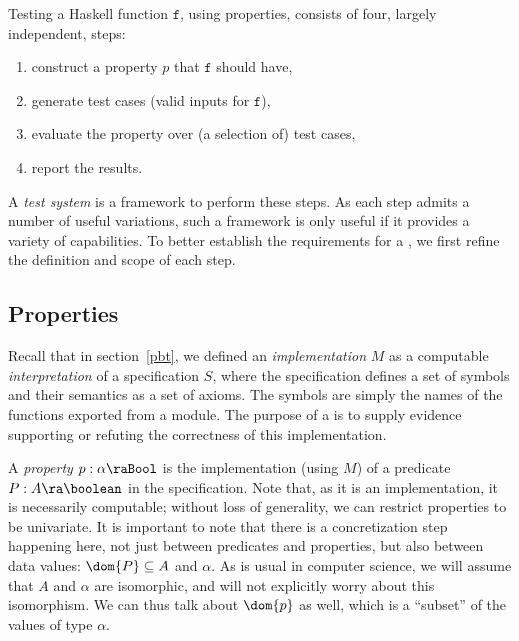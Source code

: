 
\newcommand{\hf}{\ensuremath{\mathtt{f}}\xspace}
\newcommand{\Bool}{\ensuremath{\mathtt{Bool}}}

Testing a Haskell function \hf, using properties, consists of four, largely
independent, steps:
\begin{enumerate}
\item construct a property $p$ that \hf should have,
\item generate test cases (valid inputs for \hf),
\item evaluate the property over (a selection of) test cases,
\item report the results.
\end{enumerate}

A \emph{test system} is a framework to perform these steps.  As each
step admits a number of useful variations, such a framework is only 
useful if it provides a variety of capabilities.  To better establish the
requirements for a \pbt, we first refine the definition and scope of each
step.

\subsection{Properties}

Recall that in section~\ref{pbt}, we defined an \emph{implementation} $M$ as a
computable \emph{interpretation} of a specification $S$, where the specification
defines a set of symbols and their semantics as a set of axioms.
The symbols are simply the names of the functions exported from a module.
The purpose of a \pbt is to supply evidence supporting or refuting
the correctness of this implementation.

A \emph{property}  $ p: \alpha \ra \Bool$ is the implementation (using $M$) of
a predicate $P : A \ra \boolean$ in the specification.  Note
that, as it is an implementation, it is necessarily computable; without
loss of generality, we can restrict properties to be univariate.
It is important to note that there is a concretization step happening here,
not just between predicates and properties, but also between data values:
$\dom{P} \subseteq A$ and $\alpha$.  As is usual in computer science, 
we will assume that $A$ and $\alpha$ are isomorphic, and will not explicitly
worry about this isomorphism.  We can thus talk about $\dom{p}$ as well,
which is a ``subset'' of the values of type $\alpha$.

